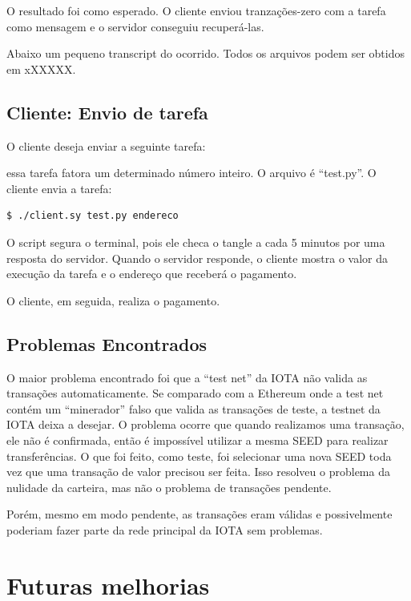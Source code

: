 \documentclass[a4paper]{article}
\begin{document}
O resultado foi como esperado. O cliente enviou tranzações-zero com a tarefa como mensagem e o servidor conseguiu recuperá-las.

Abaixo um pequeno transcript do ocorrido. Todos os arquivos podem ser obtidos em xXXXXX.

\subsection{Cliente: Envio de tarefa}

O cliente deseja enviar a seguinte tarefa:

essa tarefa fatora um determinado número inteiro. O arquivo é ``test.py''. O cliente envia a tarefa:

\begin{lstlisting}[language=bash]
  $ ./client.sy test.py endereco
\end{lstlisting}

O script segura o terminal, pois ele checa o tangle a cada 5 minutos por uma resposta do servidor. Quando o servidor responde,
o cliente mostra o valor da execução da tarefa e o endereço que receberá o pagamento.

O cliente, em seguida, realiza o pagamento.

\subsection{Problemas Encontrados}

O maior problema encontrado foi que a ``test net'' da IOTA não valida as transações automaticamente. Se comparado com a Ethereum onde a test net
contém um ``minerador'' falso que valida as transações de teste, a testnet da IOTA deixa a desejar. O problema ocorre que quando
realizamos uma transação, ele não é confirmada, então é impossível utilizar a mesma SEED para realizar transferências. O que foi feito,
como teste, foi selecionar uma nova SEED toda vez que uma transação de valor precisou ser feita. Isso resolveu o problema da nulidade
da carteira, mas não o problema de transações pendente.

Porém, mesmo em modo pendente, as transações eram válidas e possivelmente poderiam fazer parte da rede principal da IOTA
sem problemas.

\section{Futuras melhorias}\label{sec:Future}
\end{document}
